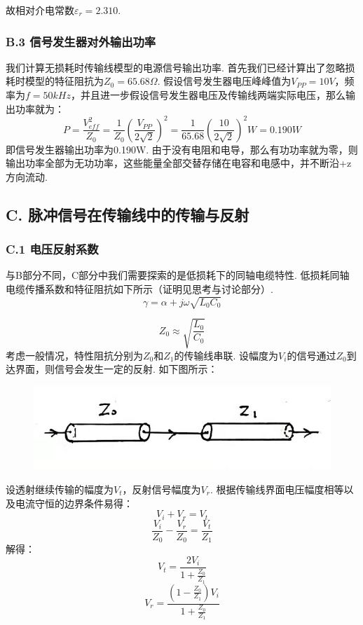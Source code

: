 \documentclass[UTF8]{ctexart}
\begin{document}
故相对介电常数$\varepsilon_r= 2.310$.


\subsubsection*{B.3 信号发生器对外输出功率}
我们计算无损耗时传输线模型的电源信号输出功率. 首先我们已经计算出了忽略损耗时模型的特征阻抗为$Z_0=65.68\Omega$. 假设信号发生器电压峰峰值为$V_{PP}=10V$，频率为$f=50kHz$，并且进一步假设信号发生器电压及传输线两端实际电压，那么输出功率就为：
\[P=\frac{V_{eff}^2}{Z_0}=\frac{1}{Z_0}(\frac{V_{PP}}{2\sqrt{2}})^2=\frac{1}{65.68}(\frac{10}{2\sqrt{2}})^2W=0.190W\]
即信号发生器输出功率为0.190W. 由于没有电阻和电导，那么有功功率就为零，则输出功率全部为无功功率，这些能量全部交替存储在电容和电感中，并不断沿+z方向流动.

\subsection*{C. 脉冲信号在传输线中的传输与反射}
\subsubsection*{C.1 电压反射系数}
与B部分不同，C部分中我们需要探索的是低损耗下的同轴电缆特性. 低损耗同轴电缆传播系数和特征阻抗如下所示（证明见思考与讨论部分）.
\begin{equation}
   \gamma=\alpha+j\omega\sqrt{L_0C_0}
   \label{ershisan}
\end{equation}

\begin{equation}
   Z_0\approx\sqrt{\frac{L_0}{C_0}}
   \label{ershisi}
\end{equation}
考虑一般情况，特性阻抗分别为$Z_0$和$Z_1$的传输线串联. 设幅度为$V_i$的信号通过$Z_0$到达界面，则信号会发生一定的反射. 如下图所示：
\begin{figure}[H]\begin{center}
    \includegraphics[scale=0.6]{17.PNG}
\end{center}\end{figure}
设透射继续传输的幅度为$V_t$，反射信号幅度为$V_r$. 根据传输线界面电压幅度相等以及电流守恒的边界条件易得：
\begin{equation}
    V_i+V_r=V_t
\end{equation}
\begin{equation}
    \frac{V_i}{Z_0}-\frac{V_r}{Z_0}=\frac{V_t}{Z_1}
\end{equation}
解得：
\begin{equation}
    V_t=\frac{2V_i}{1+\frac{Z_0}{Z_1}}
\end{equation}
\begin{equation}
    V_r=\frac{(1-\frac{Z_0}{Z_1})V_i}{1+\frac{Z_0}{Z_1}}
    \label{ershisi}
\end{equation}
\end{document}
